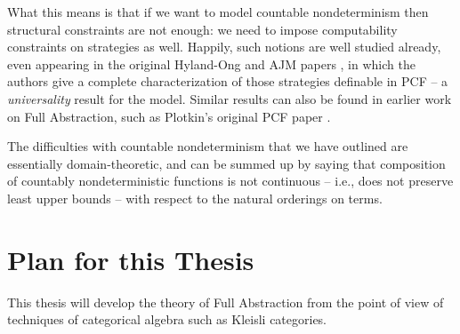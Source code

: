 What this means is that if we want to model countable nondeterminism then structural constraints are not enough: we need to impose computability constraints on strategies as well.
Happily, such notions are well studied already, even appearing in the original Hyland-Ong and AJM papers \cite{hoPcf,ajmPcf}, in which the authors give a complete characterization of those strategies definable in PCF -- a \emph{universality} result for the model.  
Similar results can also be found in earlier work on Full Abstraction, such as Plotkin's original PCF paper \cite{PlotkinPcf}.

The difficulties with countable nondeterminism that we have outlined are essentially domain-theoretic, and can be summed up by saying that composition of countably nondeterministic functions is not continuous -- i.e., does not preserve least upper bounds -- with respect to the natural orderings on terms.

\section{Plan for this Thesis}

This thesis will develop the theory of Full Abstraction from the point of view of techniques of categorical algebra such as Kleisli categories.

